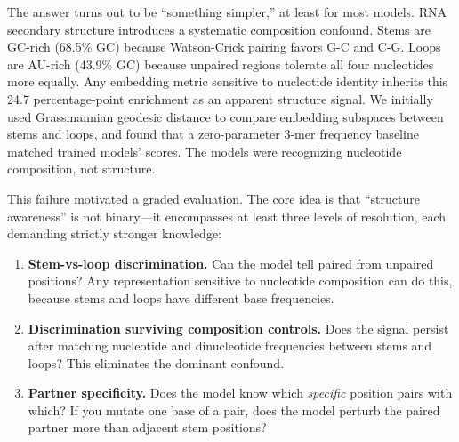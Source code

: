 \documentclass[11pt]{article}
\begin{document}
The answer turns out to be ``something simpler,'' at least for most
models. RNA secondary structure introduces a systematic composition
confound. Stems are GC-rich (68.5\% GC) because Watson-Crick pairing
favors G-C and C-G. Loops are AU-rich (43.9\% GC) because unpaired
regions tolerate all four nucleotides more equally. Any embedding
metric sensitive to nucleotide identity inherits this 24.7
percentage-point enrichment as an apparent structure signal. We
initially used Grassmannian geodesic distance to compare embedding
subspaces between stems and loops, and found that a zero-parameter
3-mer frequency baseline matched trained models' scores. The models
were recognizing nucleotide composition, not structure.

This failure motivated a graded evaluation. The core idea is that
``structure awareness'' is not binary---it encompasses at least three
levels of resolution, each demanding strictly stronger knowledge:

\begin{enumerate}[nosep]
\item \textbf{Stem-vs-loop discrimination.} Can the model tell paired
  from unpaired positions? Any representation sensitive to nucleotide
  composition can do this, because stems and loops have different
  base frequencies.
\item \textbf{Discrimination surviving composition controls.} Does the
  signal persist after matching nucleotide and dinucleotide
  frequencies between stems and loops? This eliminates the dominant
  confound.
\item \textbf{Partner specificity.} Does the model know which
  \emph{specific} position pairs with which? If you mutate one base
  of a pair, does the model perturb the paired partner more than
  adjacent stem positions?
\end{enumerate}
\end{document}
